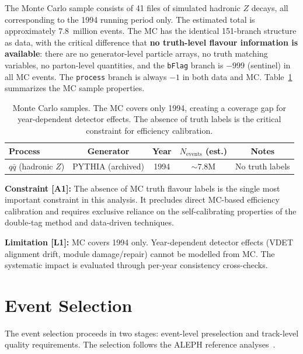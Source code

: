 \documentclass[11pt,a4paper]{article}
\begin{document}
The Monte Carlo sample consists of 41 files of simulated hadronic $Z$ decays,
all corresponding to the 1994 running period only. The estimated total is
approximately $7.8$~million events. The MC has the identical 151-branch structure
as data, with the critical difference that \textbf{no truth-level flavour information
is available}: there are no generator-level particle arrays, no truth matching
variables, no parton-level quantities, and the \texttt{bFlag} branch is $-999$
(sentinel) in all MC events. The \texttt{process} branch is always $-1$ in both
data and MC. Table~\ref{tab:mc_samples} summarizes the MC sample properties.

\begin{table}[htbp]
\centering
\caption{Monte Carlo samples. The MC covers only 1994, creating a coverage gap
for year-dependent detector effects. The absence of truth labels is the critical
constraint for efficiency calibration.}
\label{tab:mc_samples}
\begin{tabular}{lcccc}
\toprule
Process & Generator & Year & $N_\mathrm{events}$ (est.) & Notes \\
\midrule
$q\bar{q}$ (hadronic $Z$) & PYTHIA (archived) & 1994 & $\sim 7.8$M & No truth labels \\
\bottomrule
\end{tabular}
\end{table}

\noindent\textbf{Constraint [A1]:} The absence of MC truth flavour labels is the
single most important constraint in this analysis. It precludes direct MC-based
efficiency calibration and requires exclusive reliance on the self-calibrating
properties of the double-tag method and data-driven techniques.

\noindent\textbf{Limitation [L1]:} MC covers 1994 only. Year-dependent detector
effects (VDET alignment drift, module damage/repair) cannot be modelled from MC.
The systematic impact is evaluated through per-year consistency cross-checks.

\FloatBarrier
{}
\section{Event Selection}
\label{sec:selection}

The event selection proceeds in two stages: event-level preselection and track-level
quality requirements. The selection follows the ALEPH reference analyses~\cite{ALEPH:Rb:1996, ALEPH:AFBb}.
\end{document}
